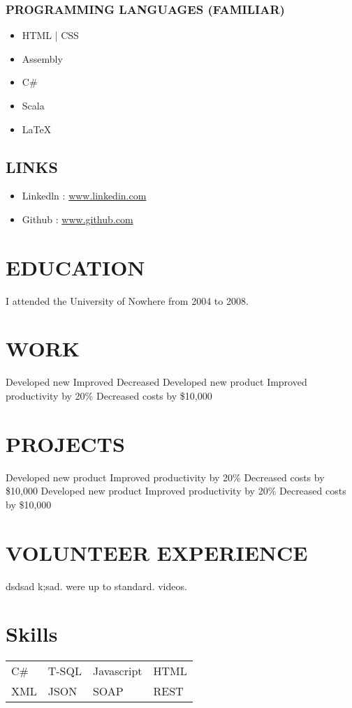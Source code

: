 \documentclass{resume}
\begin{document}
\begin{minipage}{0.33\linewidth}
\subsubsection{PROGRAMMING LANGUAGES (FAMILIAR)}
\begin{itemize}
    \item HTML | CSS  
    \item Assembly
    \item C\#
    \item Scala
    \item \LaTeX
\end{itemize}
\subsection{LINKS}
\begin{itemize}
\item Linkedln :  \href{https://www.linkedin.com/}{www.linkedin.com}
\item Github : \href{https://github.com}{www.github.com}
\end{itemize}
\end{minipage}%
\begin{minipage}{0.75\textwidth} 
\section{EDUCATION}
I attended the University of Nowhere from 2004 to 2008.
\\
\section{WORK}
\workitems
{Developed new }
{Improved }
{Decreased }
\workitems
{Developed new product}
{Improved productivity by 20\%}
{Decreased costs by \$10,000}
\section{PROJECTS}
\workitems
{Developed new product}
{Improved productivity by 20\%}
{Decreased costs by \$10,000}
\workitems
{Developed new product}
{Improved productivity by 20\%}
{Decreased costs by \$10,000}
\section{VOLUNTEER EXPERIENCE}
\workitems
{dsdsad k;sad.}
{ were up to standard.}
{ videos.}
\end{minipage}
\section{Skills} 
\begin{tabular}{l l l l} \\
C\# & T-SQL & Javascript & HTML \\
XML & JSON & SOAP & REST
\end{tabular}
\end{document}
